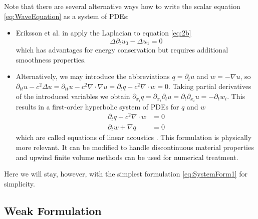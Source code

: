 \documentclass[a4paper,12pt]{article}
\begin{document}
Note that there are several alternative ways how to write the scalar equation
\eqref{eq:WaveEquation} as a system of PDEs:
\begin{itemize}
\item Eriksson et al. in \cite{Eriksson} apply the Laplacian to
equation \eqref{eq:2b}
\begin{equation}
\Delta \partial_t u_0 - \Delta u_1 = 0
\end{equation} \label{eq:Eriksson}
which has advantages for energy conservation but requires additional smoothness
properties.
\item Alternatively, we may introduce the abbreviations
$q=\partial_t u$ and $w=-\nabla u$, so $\partial_{tt} u - c^2 \Delta u =
\partial_{tt} u - c^2 \nabla\cdot\nabla u = \partial_{t} q + c^2 \nabla\cdot w = 0$.
Taking partial derivatives of the introduced variables we obtain $\partial_{x_i} q=
\partial_{x_i} \partial_t u = \partial_t \partial_{x_i}  u = - \partial_t w_i$. This results
in a first-order hyperbolic system of PDEs for $q$ and $w$
\begin{align*}
\partial_t q + c^2 \nabla\cdot w &= 0\\
\partial_t w + \nabla q &= 0
\end{align*}
which are called equations of linear acoustics \cite{LeVeque}. This formulation
is physically more relevant. It can be modified to handle discontinuous material
properties and upwind finite volume methods can be used for numerical treatment.
\end{itemize}

Here we will stay, however, with the simplest formulation \eqref{eq:SystemForm1}
for simplicity.

\subsection*{Weak Formulation}
\end{document}
